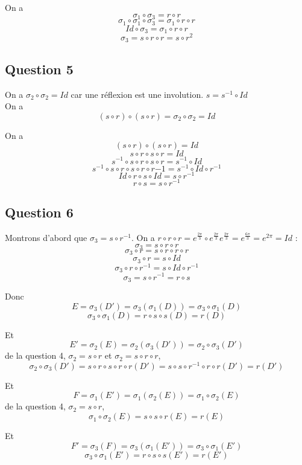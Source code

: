 \documentclass[]{book}
\theoremstyle{definition}
\begin{document}
On a
$$\sigma_1 \circ \sigma_3 = r \circ r$$
$$\sigma_1 \circ \sigma_1 \circ \sigma_3 = \sigma_1 \circ r \circ r$$
$$Id \circ \sigma_3 = \sigma_1 \circ r \circ r$$
$$\sigma_3 = s \circ r \circ r = s \circ r^2$$


\subsection*{Question 5}
On a $\sigma_2 \circ \sigma_2 = Id$ car une r\'eflexion est une involution. $s=s^{-1} \circ Id$ \\

On a
$$ (s \circ r) \circ (s \circ r) = \sigma_2 \circ \sigma_2 = Id$$

On a
$$ (s \circ r) \circ (s \circ r) = Id$$
$$ s \circ r \circ s \circ r = Id$$
$$ s^{-1} \circ s \circ r \circ s \circ r = s^{-1} \circ Id$$
$$ s^{-1} \circ s \circ r \circ s \circ r \circ r{-1} = s^{-1} \circ Id \circ r^{-1}$$
$$ Id \circ r \circ s \circ Id = s \circ r^{-1}$$
$$ r \circ s = s \circ r^{-1}$$

\subsection*{Question 6}
Montrons d'abord que $\sigma_3 = s \circ r^{-1}$. On a $r \circ r \circ r = e^{\frac{2\pi}{3}} \circ e^{\frac{2\pi}{3}} e^{\frac{2\pi}{3}} = e^{\frac{6\pi}{3}} = e^{2\pi} = Id$ :
$$\sigma_3 = s \circ r \circ r$$
$$\sigma_3 \circ r = s \circ r \circ r \circ r$$
$$\sigma_3 \circ r = s \circ Id$$
$$\sigma_3 \circ r \circ r^{-1} = s \circ Id  \circ r^{-1}$$
$$\sigma_3 = s \circ r^{-1} = r \circ s$$

Donc 
$$E = \sigma_3(D') = \sigma_3(\sigma_1(D)) = \sigma_3 \circ \sigma_1(D)$$
$$\sigma_3 \circ \sigma_1(D) = r \circ s \circ s(D) = r(D)$$

Et
$$E' = \sigma_2(E) = \sigma_2(\sigma_3(D')) = \sigma_2 \circ \sigma_3(D')$$
de la question 4, $\sigma_2 = s \circ r$ et $\sigma_2 = s \circ r \circ r$,
$$\sigma_2 \circ \sigma_3(D') = s \circ r \circ s \circ r \circ r(D') = s \circ s \circ r^{-1} \circ r \circ r(D') = r(D')$$

Et 
$$F = \sigma_1(E') = \sigma_1(\sigma_2(E)) = \sigma_1 \circ \sigma_2(E)$$
de la question 4, $\sigma_2 = s \circ r$,
$$\sigma_1 \circ \sigma_2(E) = s \circ s \circ r(E) = r(E)$$

Et 
$$F' = \sigma_3(F) = \sigma_3(\sigma_1(E')) = \sigma_3 \circ \sigma_1(E')$$
$$\sigma_3 \circ \sigma_1(E') = r \circ s \circ s(E') = r(E')$$
\end{document}
